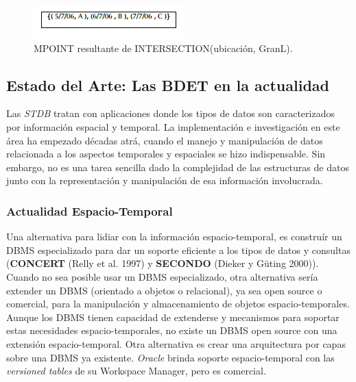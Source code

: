 \documentclass[a4paper,12pt,oneside]{report}
\begin{document}
\begin{figure}
\center
\includegraphics[scale=0.6]{images/gutinguin.png}
\caption{MPOINT resultante de INTERSECTION(ubicaci\'on, GranL).}
\end{figure}

\subsection*{Estado del Arte: Las BDET en la actualidad}
Las \textit{STDB} tratan con aplicaciones donde los tipos de datos son caracterizados por informaci\'on espacial y temporal. La implementaci\'on e investigaci\'on en este \'area ha empezado d\'ecadas atr\'a, cuando el manejo y manipulaci\'on de datos relacionada a los aspectos temporales y espaciales se hizo indispensable. Sin embargo, no es una tarea sencilla dado la complejidad de las estructuras de datos junto con la representaci\'on y manipulaci\'on de esa informaci\'on involucrada.

\subsubsection*{Actualidad Espacio-Temporal}
Una alternativa para lidiar con la informaci\'on espacio-temporal, es constru\'ir un DBMS especializado para dar un soporte eficiente a los tipos de datos y consultas (\textbf{CONCERT} (Relly et al. 1997) y \textbf{SECONDO} (Dieker y G\"uting 2000)). Cuando no sea posible usar un DBMS especializado, otra alternativa ser\'ia extender un DBMS (orientado a objetos o relacional), ya sea open source o comercial, para la manipulaci\'on y almacenamiento de objetos espacio-temporales.\\
Aunque los DBMS tienen capacidad de extenderse y mecanismos para soportar estas necesidades espacio-temporales, no existe un DBMS open source con una extensi\'on espacio-temporal. Otra alternativa es crear una arquitectura por capas sobre una DBMS ya existente. \textit{Oracle} brinda soporte espacio-temporal con las \textit{versioned tables} de su Workspace Manager, pero es comercial.
\end{document}
